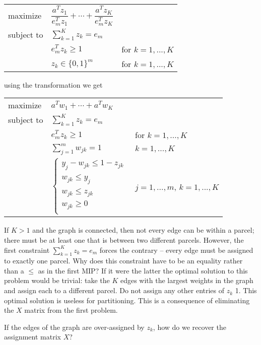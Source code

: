 \bgroup
\def\arraystretch{1.5}
\begin{tabular}{l l l}
maximize   & $\dfrac{a^T z_1}{e_m^T z_1} + \cdots +
              \dfrac{a^T z_K}{e_m^T z_K}$ \\
subject to & $\sum_{k=1}^K z_k = e_m$ \\
           & $e_m^T z_k \geq 1$   & for $k = 1, ..., K$ \\
           & $z_k \in \{0, 1\}^m$ & for $k = 1, ..., K$ \\
\end{tabular}
\egroup

using the \cite{Li:94} transformation we get
\bgroup
\def\arraystretch{1.5}
\begin{tabular}{l l l}
maximize   & $a^T w_1 + \cdots + a^T w_K$ \\
subject to & $\sum_{k=1}^K z_k = e_m$ \\
           & $e_m^T z_k \geq 1$  & for $k = 1, ..., K$ \\
           & $\sum_{j=1}^m w_{jk} = 1$ & $k = 1, ..., K$ \\
           & $\begin{cases}
                y_j - w_{jk} \leq 1 - z_{jk} \\
                w_{jk} \leq y_j \\
                w_{jk} \leq z_{jk} \\
                w_{jk} \geq 0 \\
             \end{cases}$
           & $j = 1, ..., m$, $k = 1, ..., K$ \\
\end{tabular}
\egroup

If $K > 1$ and the graph is connected, then not every edge can be
within a parcel; there must be at least one that is between two
different parcels. However, the first constraint
$\sum_{k=1}^K z_k = e_m$ forces the contrary -- every edge must be
assigned to exactly one parcel. Why does this constraint have to be an
equality rather than a $\leq$ as in the first MIP? If it were the latter
the optimal solution to this problem would be trivial: take the $K$
edges with the largest weights in the graph and assign each to a
different parcel. Do not assign any other entries of $z_k$ 1. This
optimal solution is useless for partitioning. This is a consequence of
eliminating the $X$ matrix from the first problem.

If the edges of the graph are over-assigned by $z_k$, how do we recover
the assignment matrix $X$?



